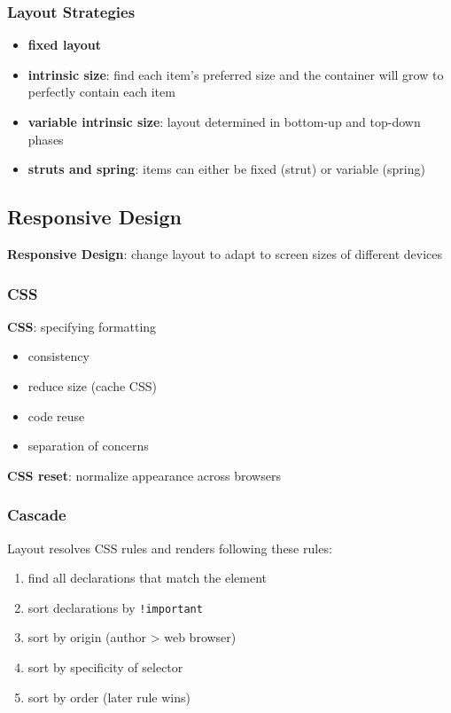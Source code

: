 \documentclass[]{article}
\theoremstyle{definition}
\begin{document}
			\subsubsection{Layout Strategies}
				\begin{itemize}
					\item \textbf{fixed layout}
					\item \textbf{intrinsic size}:	find each item's preferred size and the container will grow to perfectly contain each item
					\item \textbf{variable intrinsic size}:	layout determined in bottom-up and top-down phases
					\item \textbf{struts and spring}:	items can either be fixed (strut) or variable (spring)
				\end{itemize}
		\subsection{Responsive Design}
			\textbf{Responsive Design}: change layout to adapt to screen sizes of different devices
			\subsubsection{CSS}
				\textbf{CSS}:	specifying formatting
				\begin{itemize}
					\item consistency
					\item reduce size (cache CSS)
					\item code reuse
					\item separation of concerns
				\end{itemize}
				\textbf{CSS reset}:	normalize appearance across browsers
			\subsubsection{Cascade}
				Layout resolves CSS rules and renders following these rules:
				\begin{enumerate}
					\item find all declarations that match the element
					\item sort declarations by \lstinline|!important|
					\item sort by origin (author > web browser)
					\item sort by specificity of selector
					\item sort by order (later rule wins)
				\end{enumerate}
\end{document}
